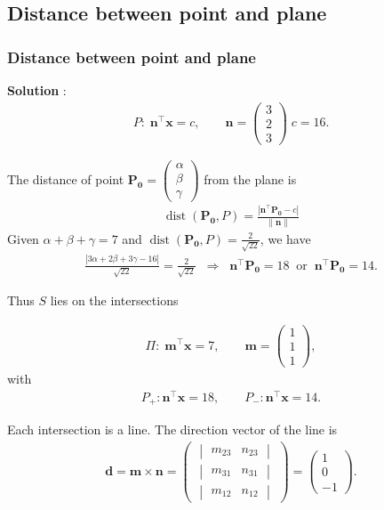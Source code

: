 \documentclass{beamer}
\theoremstyle{remark}
\newcommand{\mydet}[1]{\ensuremath{\begin{vmatrix}#1\end{vmatrix}}}
\providecommand{\norm}[1]{\lVert#1\rVert}
\newcommand{\myvec}[1]{\ensuremath{\begin{pmatrix}#1\end{pmatrix}}}
\let\vec\mathbf
\numberwithin{equation}{section}
\begin{document}
\subsection{Distance between point and plane}
\begin{frame}
\frametitle{Distance between point and plane}
\textbf{Solution} :
\begin{align}
P:\; \vec{n}^\top \vec{x} = c,\qquad \vec{n}=\myvec {3\\2\\3}\;c=16.
\end{align}

The distance of point $\vec{P_0}=\myvec{\alpha\\ \beta\\ \gamma}$ from the plane is
\begin{align}
\operatorname{dist}(\vec{P_0},P)=\frac{|\vec{n}^\top \vec{P_0} - c|}{\norm{\vec{n}}}
\end{align}
Given $\alpha+\beta+\gamma=7$ and $\operatorname{dist}(\vec{P_0},P)=\tfrac{2}{\sqrt{22}}$, we have
\begin{align}
\frac{|3\alpha+2\beta+3\gamma-16|}{\sqrt{22}}=\frac{2}{\sqrt{22}}
\;\;\Longrightarrow\;\; \vec{n}^\top \vec{P_0}=18 \;\;\text{or}\;\; \vec{n}^\top \vec{P_0}=14.
\end{align}

Thus $S$ lies on the intersections
\end{frame}
\begin{frame}
\begin{align}
\Pi:\; \vec{m}^\top \vec{x}=7,\qquad \vec{m}=\myvec{1\\1\\1},
\end{align}
with
\begin{align}
P_+: \vec{n}^\top \vec{x}=18,\qquad P_-:\vec{n}^\top \vec{x}=14.
\end{align}

Each intersection is a line.  
The direction vector of the line is
\begin{align}
\vec{d} = \vec{m}\times \vec{n} =
\myvec{
\mydet
{m_{23} & n_{23}} \\
 \mydet
 {m_{31} & n_{31}} \\
\mydet
{m_{12} & n_{12}}
}
=
\myvec{1\\0\\-1}.
\end{align}

\end{frame}
\end{document}
